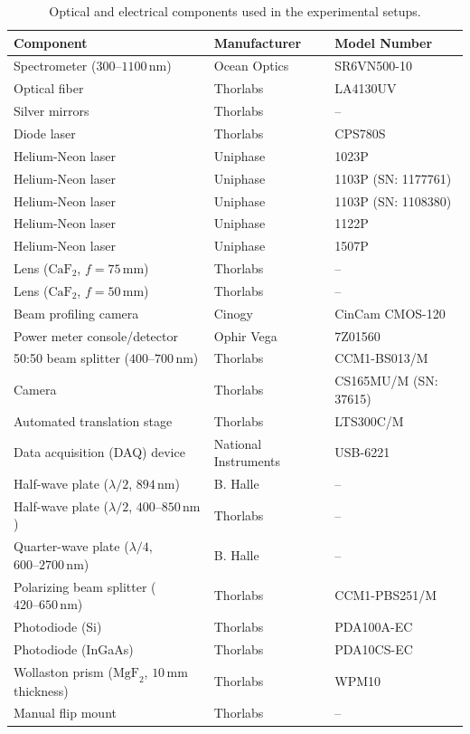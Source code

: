 \begin{appendix}
\begin{table}[htbp]
    \centering
    \footnotesize
    \setlength{\tabcolsep}{4pt}
    \caption{Optical and electrical components used in the experimental setups.}
    \label{tab:optical_components}
    \begin{tabular}{lll}
        \hline
        Component & Manufacturer & Model Number \\
        \hline
        Spectrometer (\(300\text{--}1100\,\mathrm{nm}\)) & Ocean Optics & SR6VN500-10 \\
        Optical fiber & Thorlabs & LA4130UV \\
        Silver mirrors & Thorlabs & -- \\
        Diode laser & Thorlabs & CPS780S \\
        Helium-Neon laser & Uniphase & 1023P \\
        Helium-Neon laser & Uniphase & 1103P (SN: 1177761) \\
        Helium-Neon laser & Uniphase & 1103P (SN: 1108380) \\
        Helium-Neon laser & Uniphase & 1122P \\
        Helium-Neon laser & Uniphase & 1507P \\
        Lens (\(\mathrm{CaF}_2\), \(f = 75\,\mathrm{mm}\)) & Thorlabs & -- \\
        Lens (\(\mathrm{CaF}_2\), \(f = 50\,\mathrm{mm}\)) & Thorlabs & -- \\
        Beam profiling camera & Cinogy & CinCam CMOS-120 \\
        Power meter console/detector & Ophir Vega & 7Z01560 \\
        50:50 beam splitter (\(400\text{--}700\,\mathrm{nm}\)) & Thorlabs & CCM1-BS013/M \\
        Camera & Thorlabs & CS165MU/M (SN: 37615) \\
        Automated translation stage & Thorlabs & LTS300C/M \\
        Data acquisition (DAQ) device & National Instruments & USB-6221 \\
        Half-wave plate (\(\lambda/2\), \(894\,\mathrm{nm}\)) & B. Halle & -- \\
        Half-wave plate (\(\lambda/2\), \(400\text{--}850\,\mathrm{nm}\)) & Thorlabs & -- \\
        Quarter-wave plate (\(\lambda/4\), \(600\text{--}2700\,\mathrm{nm}\)) & B. Halle & -- \\
        Polarizing beam splitter (\(420\text{--}650\,\mathrm{nm}\)) & Thorlabs & CCM1-PBS251/M \\
        Photodiode (Si) & Thorlabs & PDA100A-EC \\
        Photodiode (InGaAs) & Thorlabs & PDA10CS-EC \\
        Wollaston prism (\(\mathrm{MgF}_2\), \(10\,\mathrm{mm}\) thickness) & Thorlabs & WPM10 \\
        Manual flip mount & Thorlabs & -- \\
        \hline
    \end{tabular}
\end{table}

\end{appendix}
